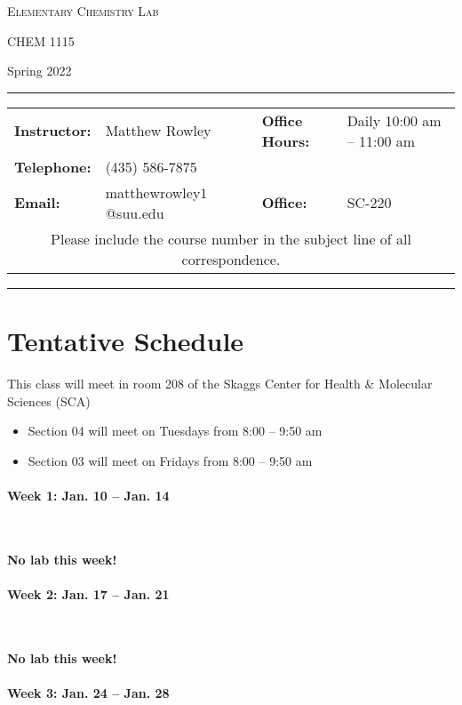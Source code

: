 \documentclass[12pt, letterpaper]{article}
\begin{document}
\begin{center}
	{\Large \textsc{Elementary Chemistry Lab}}

	CHEM 1115
\end{center}

\begin{center}
{\large Spring 2022}
\end{center}
\begin{center}
	\rule{0.99\textwidth}{0.4pt}
	\begin{tabular}{llcll}
		\textbf{Instructor:} & Matthew Rowley & & \textbf{Office Hours:} & Daily 10:00 am -- 11:00 am \\
		\textbf{Telephone:} & (435) 586-7875 & & & \\
		\textbf{Email:} & matthewrowley$1$@suu.edu  & & \textbf{Office:} & SC-220\\
		\multicolumn{5}{c}{Please include the course number in the subject line of all correspondence.}
	\end{tabular}
	\rule{0.99\textwidth}{0.4pt}
\end{center}

\section*{Tentative Schedule}
This class will meet in room 208 of the Skaggs Center for Health \& Molecular Sciences (SCA)
\begin{itemize}
	\item Section 04 will meet on Tuesdays from 8:00 – 9:50 am
	\item Section 03 will meet on Fridays from 8:00 – 9:50 am
\end{itemize}

\paragraph{Week 1: Jan. 10 -- Jan. 14}~

\textbf{No lab this week!}

\paragraph{Week 2: Jan. 17 -- Jan. 21}~

\textbf{No lab this week!}

\paragraph{Week 3: Jan. 24 -- Jan. 28}~
\end{document}
